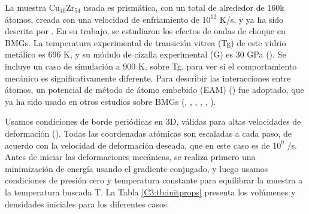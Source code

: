 La muestra Cu$_{46}$Zr$_{54}$ usada es prismática, con un total de alrededor de 160k átomos, creada con una velocidad de enfriamiento de $10^12$ K/s, y ya ha sido descrita por \cite{arman10}. En su trabajo, se estudiaron los efectos de ondas de choque en BMGs. La temperatura experimental de transición vitrea (Tg) de este vidrio metálico es 696 K, y su módulo de cizalla experimental (G) es 30 GPa (\cite{johnson05}). Se incluye un caso de simulación a 900 K, sobre Tg, para ver si el comportamiento mecánico es significativamente diferente. Para describir las interacciones entre átomos, un potencial de método de átomo embebido (EAM) (\cite{daw84}) fue adoptado, que ya ha sido usado en otros estudios sobre BMGs (\cite{shimizu07}, \cite{cao09}, \cite{cheng08}, \cite{arman10}, \cite{cheng11}, \cite{wang12}).


Usamos condiciones de borde periódicas en 3D, válidas para altas velocidades de deformación (\cite{bringa05}). Todas las coordenadas atómicas son escaladas a cada paso, de acuerdo con la velocidad de deformación deseada, que en este caso es de $10^9$ /s. Antes de iniciar las deformaciones mecánicas, se realiza primero una minimización de energía usando el gradiente conjugado, y luego usamos condiciones de presión cero y temperatura constante para equilibrar la muestra a la temperatura buscada T. La Tabla \ref{C3:tb:initprops} presenta los volúmenes y densidades iniciales para los diferentes casos.


